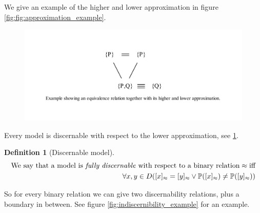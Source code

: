 \documentclass[11pt,a4paper,notitlepage,onecolumn,twoside]{article}
\newtheorem{definition}{Definition}
\begin{document}

We give an example of the higher and lower approximation in figure \ref{fig:fig:approximation_example}.

\begin{figure}
\label{fig:approximation_example}
\includegraphics{approximation_example}
\end{figure}

Every model is discernable with respect to the lower approximation, see \ref{def:fully_discernable}.

\begin{definition}[Discernable model]
\label{def:fully_discernable}
\begin{align}
\text{We say that a model is \emph{fully discernable} with respect to a binary relation} \approx \text{iff} \\
\forall x, y \in D (
    [x]_{\approx} = [y]_{\approx}
  \lor
    \mathbb{P}([x]_{\approx}) \neq \mathbb{P}([y]_{\approx})
  )
\end{align}
\end{definition}

So for every binary relation we can give two discernability relations, plus a boundary in between. See figure \ref{fig:indiscernibility_example} for an example.
\end{document}
